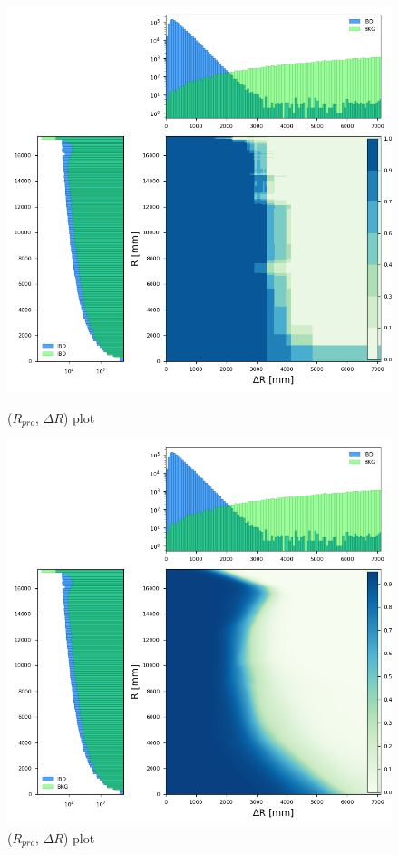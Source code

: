 \begin{figure}[h!]
	\centering
	\begin{minipage}{0.5\textwidth}
		\centering
		\includegraphics[width=0.8\linewidth]{Images/dr_r_xgboost}
		\caption{($R_{pro}$, $\Delta R$) plot}
		\label{fig:dr_r_xgboost}
	\end{minipage}%
	\begin{minipage}{0.5\textwidth}
		\centering
		\includegraphics[width=0.8\linewidth]{Images/dr_r_pytorch}
		\caption{($R_{pro}$, $\Delta R$) plot}
		\label{fig:dr_r_pytorch}
	\end{minipage}
\end{figure}


